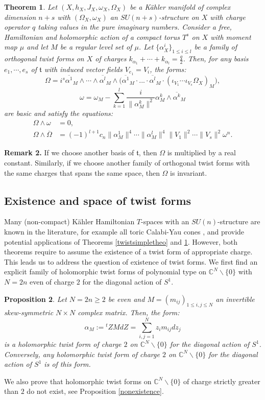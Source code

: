 \documentclass[12pt, reqno]{amsart}
\newtheorem{introthm}{Theorem}
\newtheorem{introprop}[introthm]{Proposition}
\newcommand{\C}{\mathbb{C}}
\newcommand{\tor}{\mathfrak{t}}
\begin{document}
\begin{introthm}\label{multipletwisttheo}
    Let $(X,h_X,J_X,\omega_X,\Omega_X)$ be a Kähler manifold of complex dimension $n+s$ with $(\Omega_X,\omega_X)$ an $SU(n+s)$-structure on $X$ with charge operator $q$ taking values in the pure imaginary numbers. Consider a free, Hamiltonian and holomorphic action of a compact torus $T^s$ on $X$ with moment map $\mu$ and let $M$ be a regular level set of $\mu$. Let $\{\alpha^i_X\}_{1\leq i\leq l}$ be a family of orthogonal twist forms on $X$ of charges $k_{\alpha_1}+\cdots+k_{\alpha_l}=\frac{q}{2}$. Then, for any basis $e_1,\cdots,e_s$ of $\tor$ with induced vector fields $V_{e_1}=V_i$, the forms:
    \[\Omega=i^s\overline{\alpha^1}_M\wedge\cdots\wedge\overline{\alpha^l}_M\wedge\bigg(\overline{\alpha^1}_M\cdot...\cdot\overline{\alpha^l}_M\cdot(\iota_{V_1}\cdots\iota_{V_s}\Omega_X)_M\bigg), \]\[\omega=\omega_M-\sum_{k=1}^l\frac{i}{\|\alpha^k_M\|^2}\alpha^k_M\wedge\overline{\alpha^k}_M\]
    are basic and satisfy the equations:
    \begin{align}
        \Omega\wedge\omega&=0, \label{eq1theo2}\\
        \Omega\wedge\overline{\Omega}&=(-1)^{l+1}c_n\|\alpha^1_M\|^4\cdots\|\alpha^l_M\|^4\|V_1\|^2\cdots\|V_s\|^2\omega^n. \label{eq2theo2}
    \end{align}
\end{introthm}
\noindent\textbf{Remark 2.} If we choose another basis of $\tor$, then $\Omega$ is multiplied by a real constant. Similarly, if we choose another family of orthogonal twist forms with the same charges that spans the same space, then $\Omega$ is invariant. 
\subsection{Existence and space of twist forms} Many (non-compact) Kähler Hamiltonian $T$-spaces with an $SU(n)$-structure are known in the literature, for example all toric Calabi-Yau cones \cite{1264601036}, and provide potential applications of Theorems \ref{twistsimpletheo} and \ref{multipletwisttheo}. However, both theorems require to assume the existence of a twist form of appropriate charge. This leads us to address the question of existence of twist forms. We first find an explicit family of holomorphic twist forms of polynomial type on $\C^N\backslash\{0\}$ with $N=2n$ even of charge $2$ for the diagonal action of $S^1$.
\begin{introprop}\label{su(3)cp3} Let $N=2n\geq 2$ be even and $M=(m_{ij})_{1\leq i,j\leq N}$ an invertible skew-symmetric $N\times N$ complex matrix. Then, the form: \[\alpha_M:={}^tZMdZ=\sum_{i,j=1}^Nz_im_{ij}dz_j\] is a holomorphic twist form of charge $2$ on $\C^N\backslash\{0\}$ for the diagonal action of $S^1$. Conversely, any holomorphic twist form of charge $2$ on $\C^N\backslash\{0\}$ for the diagonal action of $S^1$ is of this form.
\end{introprop}
We also prove that holomorphic twist forms on $\C^N\backslash\{0\}$ of charge strictly greater than $2$ do not exist, see Proposition \ref{nonexistence}. 
\end{document}
